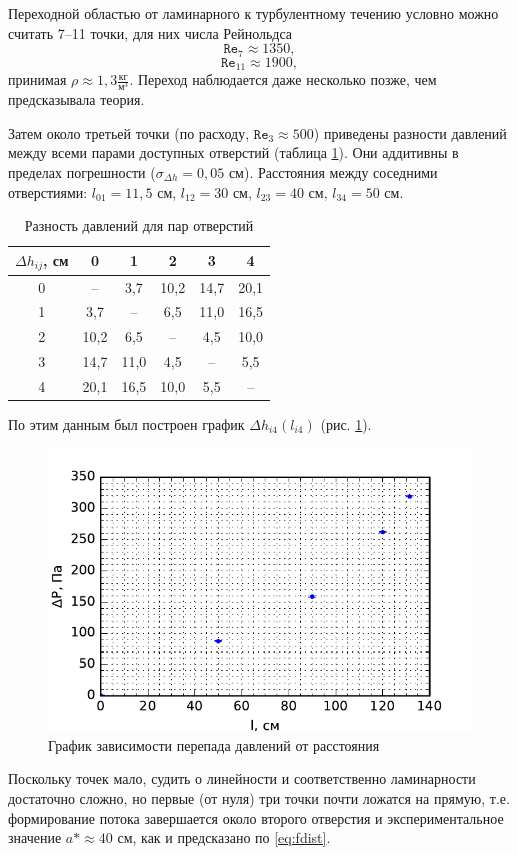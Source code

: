 \documentclass[12pt]{article}
\begin{document}
	Переходной областью от ламинарного к турбулентному течению условно можно считать 7--11 точки, для них числа Рейнольдса $$\texttt{Re}_7\approx 1350,$$ $$\texttt{Re}_{11}\approx 1900,$$ принимая $\rho \approx 1,3 \frac{\text{кг}}{\text{м}^3}$. Переход наблюдается даже несколько позже, чем предсказывала теория.
	
	Затем около третьей точки (по расходу, $\texttt{Re}_3\approx 500$) приведены разности давлений между всеми парами доступных отверстий (таблица \ref{tbl:res_p_l}). Они аддитивны в пределах погрешности ($\sigma_{\Delta h}=0{,}05$ см). Расстояния между соседними отверстиями: $l_{01}=11{,}5$ см, $l_{12}=30$ см, $l_{23}=40$ см, $l_{34}=50$ см.
	
	\begin{table}[!h]
		\caption{Разность давлений для пар отверстий}
		\label{tbl:res_p_l}
		\begin{center}
		\begin{tabular}{|c|ccccc|}
			\hline
			$\Delta h_{ij}$, см & 0 & 1 & 2 & 3 & 4 \\
			\hline
			0 & -- & 3,7 & 10,2 & 14,7 & 20,1 \\
			1 & 3,7 & -- & 6,5 & 11,0 & 16,5 \\
			2 & 10,2 & 6,5 & -- & 4,5 & 10,0 \\
			3 & 14,7 & 11,0 & 4,5 & -- & 5,5 \\
			4 & 20,1 & 16,5 & 10,0 & 5,5 & -- \\
			\hline
		\end{tabular}
		\end{center}
	\end{table}
	
	По этим данным был построен график $\Delta h_{i4} \left( l_{i4} \right)$ (рис. \ref{fig:graph_p_l}).
	
	\begin{figure}[!h]
	\caption{График зависимости перепада давлений от расстояния}
	\label{fig:graph_p_l}
	\begin{center}
	\includegraphics[scale=1]{graph_p_l.pdf}
	\end{center}
	\end{figure}
	
	Поскольку точек мало, судить о линейности и соответственно ламинарности достаточно сложно, но первые (от нуля) три точки почти ложатся на прямую, т.е. формирование потока завершается около второго отверстия и экспериментальное значение $a*\approx 40$ см, как и предсказано по \eqref{eq:fdist}.
	
\end{document}
